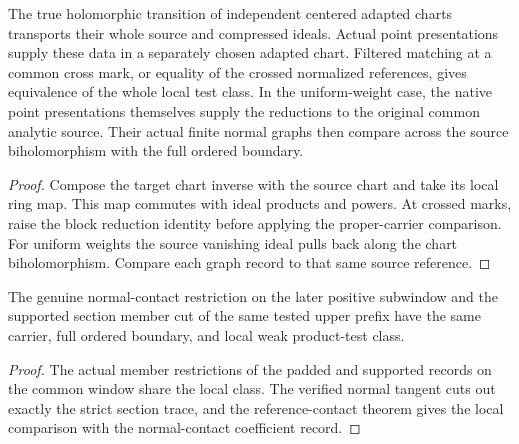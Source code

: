 \begin{theorem}
\label{hir:g1-independent-weighted-chart-transport}
\leanok
The true holomorphic transition of independent centered adapted charts
transports their whole source and compressed ideals. Actual point
presentations supply these data in a separately chosen adapted chart.
Filtered matching at a common cross mark, or equality of the crossed
normalized references, gives equivalence of the whole local test class.
In the uniform-weight case, the native point presentations themselves
supply the reductions to the original common analytic source. Their
actual finite normal graphs then compare across the source
biholomorphism with the full ordered boundary.
\end{theorem}
\begin{proof}
Compose the target chart inverse with the source chart and take its
local ring map. This map commutes with ideal products and powers.
At crossed marks, raise the block reduction identity before applying
the proper-carrier comparison. For uniform weights the source
vanishing ideal pulls back along the chart biholomorphism.
Compare each graph record to that same source reference.
\end{proof}

\begin{theorem}
\label{hir:g1-later-selected-section-class}
\leanok
The genuine normal-contact restriction on the later positive
subwindow and the supported section member cut of the same tested
upper prefix have the same carrier, full ordered boundary, and
local weak product-test class.
\end{theorem}
\begin{proof}
The actual member restrictions of the padded and supported records
on the common window share the local class. The verified normal
tangent cuts out exactly the strict section trace, and the
reference-contact theorem gives the local comparison with the
normal-contact coefficient record.
\end{proof}

